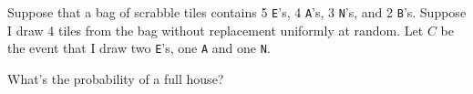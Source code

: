 \documentclass[addpoints,12pt]{exam}
\begin{document}
\begin{questions}
\begin{parts}
\end{parts}

\question[2] Suppose that a bag of scrabble tiles contains 5 \texttt{E}'s, 4 \texttt{A}'s, 3 \texttt{N}'s, and 2 \texttt{B}'s. Suppose I draw 4 tiles from the bag without replacement uniformly at random. Let $C$ be the event that I draw two \texttt{E}'s, one \texttt{A} and one \texttt{N}.

\noaddpoints
{}

\question[1] What's the probability of a full house?
\end{questions}
\end{document}
